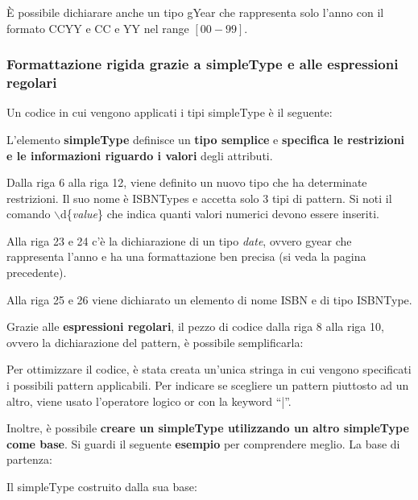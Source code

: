 \documentclass[a4paper]{article}
\newcommand{\dquotes}[1]{``#1''}
\begin{document}
	\noindent
	È possibile dichiarare anche un tipo \textsf{gYear} che rappresenta solo l'anno con il formato \textsf{CCYY} e \textsf{CC} e \textsf{YY} nel range $\left[00-99\right]$.\newpage
	
	\subsubsection{Formattazione rigida grazie a \textsf{simpleType} e alle espressioni regolari}\label{par: simpleType}
	
	\noindent
	Un codice in cui vengono applicati i tipi \textsf{simpleType} è il seguente:
	
	L'elemento \textcolor{Red3}{\textbf{\textsf{simpleType}}} definisce un \textbf{tipo semplice} e \textbf{specifica le restrizioni e le informazioni riguardo i valori} degli attributi.\newline
	
	\noindent
	Dalla riga 6 alla riga 12, viene definito un nuovo tipo che ha determinate restrizioni. Il suo nome è \textsf{ISBNTypes} e accetta solo 3 tipi di pattern. Si noti il comando \textsf{$\backslash$d\{\emph{value}\}} che indica quanti valori numerici devono essere inseriti.\newline
	
	\noindent
	Alla riga 23 e 24 c'è la dichiarazione di un tipo \emph{date}, ovvero \textsf{gyear} che rappresenta l'anno e ha una formattazione ben precisa (si veda la pagina precedente).\newline
	
	\noindent
	Alla riga 25 e 26 viene dichiarato un elemento di nome \textsf{ISBN} e di tipo \textsf{ISBNType}.\newpage
	
	\noindent
	Grazie alle \textbf{espressioni regolari}, il pezzo di codice dalla riga 8 alla riga 10, ovvero la dichiarazione del pattern, è possibile semplificarla:
	
	Per ottimizzare il codice, è stata creata un'unica stringa in cui vengono specificati i possibili pattern applicabili. Per indicare se scegliere un pattern piuttosto ad un altro, viene usato l'operatore logico or con la keyword \dquotes{|}.\newline
	
	\noindent
	Inoltre, è possibile \textbf{creare un \textsf{simpleType} utilizzando un altro \textsf{simpleType} come base}. Si guardi il seguente \textcolor{Green4}{\textbf{esempio}} per comprendere meglio. La base di partenza:
	
	Il \textsf{simpleType} costruito dalla sua base:
	
	
\end{document}
